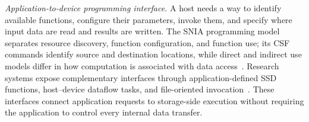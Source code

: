 \emph{Application-to-device programming interface.} A host needs a way to identify available functions, configure their parameters, invoke them, and specify where input data are read and results are written. The SNIA programming model separates resource discovery, function configuration, and function use; its CSF commands identify source and destination locations, while direct and indirect use models differ in how computation is associated with data access~\cite{sniacs}. Research systems expose complementary interfaces through application-defined SSD functions, host--device dataflow tasks, and file-oriented invocation~\cite{willow,biscuit,insider}. These interfaces connect application requests to storage-side execution without requiring the application to control every internal data transfer.
\par
\endgroup
